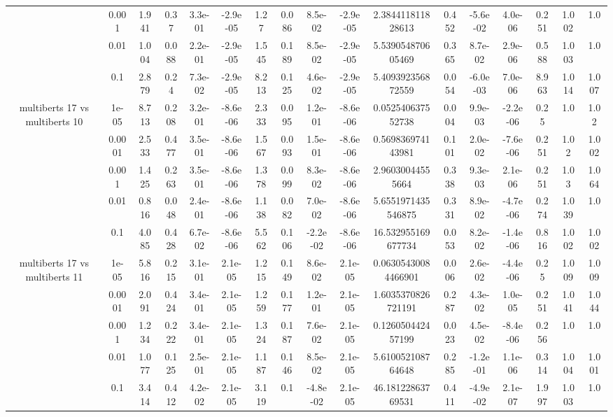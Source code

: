 \begin{tabular}{|c|c|c|c|c|c|c|c|c|c|c|c|c|c|c|c|c|}
 & 0.001 & 1.941 & 0.37 & 3.3e-01 & -2.9e-05 & 1.27 & 0.086 & 8.5e-02 & -2.9e-05 & 2.384411811828613 & 0.452 & -5.6e-02 & 4.0e-06 & 0.251 & 1.002 & 1.0 \\
 & 0.01 & 1.004 & 0.088 & 2.2e-01 & -2.9e-05 & 1.545 & 0.189 & 8.5e-02 & -2.9e-05 & 5.539054870605469 & 0.365 & 8.7e-02 & 2.9e-06 & 0.588 & 1.003 & 1.0 \\
 & 0.1 & 2.879 & 0.24 & 7.3e-02 & -2.9e-05 & 8.213 & 0.125 & 4.6e-02 & -2.9e-05 & 5.409392356872559 & 0.054 & -6.0e-03 & 7.0e-06 & 8.963 & 1.014 & 1.007 \\
\hline
\multirow{5}{*}{multiberts 17 vs multiberts 10} & 1e-05 & 8.713 & 0.208 & 3.2e-01 & -8.6e-06 & 2.333 & 0.095 & 1.2e-01 & -8.6e-06 & 0.052540637552738 & 0.004 & 9.9e-03 & -2.2e-06 & 0.25 & 1.0 & 1.02 \\
 & 0.0001 & 2.533 & 0.477 & 3.5e-01 & -8.6e-06 & 1.567 & 0.093 & 1.5e-01 & -8.6e-06 & 0.569836974143981 & 0.101 & 2.0e-02 & -7.6e-06 & 0.251 & 1.02 & 1.002 \\
 & 0.001 & 1.425 & 0.263 & 3.5e-01 & -8.6e-06 & 1.378 & 0.099 & 8.3e-02 & -8.6e-06 & 2.96030044555664 & 0.338 & 9.3e-03 & 2.1e-06 & 0.251 & 1.03 & 1.064 \\
 & 0.01 & 0.816 & 0.048 & 2.4e-01 & -8.6e-06 & 1.138 & 0.082 & 7.0e-02 & -8.6e-06 & 5.6551971435546875 & 0.331 & 8.9e-02 & -4.7e-06 & 0.274 & 1.039 & 1.0 \\
 & 0.1 & 4.085 & 0.428 & 6.7e-02 & -8.6e-06 & 5.562 & 0.106 & -2.2e-02 & -8.6e-06 & 16.532955169677734 & 0.053 & 8.2e-02 & -1.4e-06 & 0.816 & 1.002 & 1.002 \\
\hline
\multirow{5}{*}{multiberts 17 vs multiberts 11} & 1e-05 & 5.816 & 0.215 & 3.1e-01 & 2.1e-05 & 1.215 & 0.149 & 8.6e-02 & 2.1e-05 & 0.06305430084466901 & 0.006 & 2.6e-02 & -4.4e-06 & 0.25 & 1.009 & 1.009 \\
 & 0.0001 & 2.091 & 0.424 & 3.4e-01 & 2.1e-05 & 1.259 & 0.177 & 1.2e-01 & 2.1e-05 & 1.6035370826721191 & 0.287 & 4.3e-02 & 1.0e-05 & 0.251 & 1.041 & 1.044 \\
 & 0.001 & 1.234 & 0.222 & 3.4e-01 & 2.1e-05 & 1.324 & 0.187 & 7.6e-02 & 2.1e-05 & 0.126050442457199 & 0.023 & 4.5e-02 & -8.4e-06 & 0.256 & 1.0 & 1.0 \\
 & 0.01 & 1.077 & 0.125 & 2.5e-01 & 2.1e-05 & 1.187 & 0.146 & 8.5e-02 & 2.1e-05 & 5.610052108764648 & 0.285 & -1.2e-01 & 1.1e-06 & 0.314 & 1.004 & 1.001 \\
 & 0.1 & 3.414 & 0.412 & 4.2e-02 & 2.1e-05 & 3.119 & 0.1 & -4.8e-02 & 2.1e-05 & 46.18122863769531 & 0.411 & -4.9e-02 & 2.1e-07 & 1.997 & 1.003 & 1.0 \\

\end{tabular}
